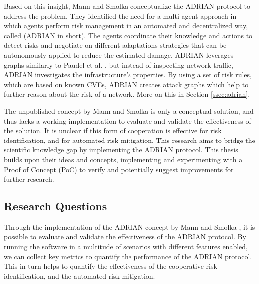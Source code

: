 Based on this insight, Mann and Smolka \cite{mann2023ADRIAN} conceptualize the ADRIAN protocol to address the problem. They identified the need for a multi-agent approach in which agents perform risk management in an automated and decentralized way, called \ADRIAN (ADRIAN in short). The agents coordinate their knowledge and actions to detect risks and negotiate on different adaptations strategies that can be autonomously applied to reduce the estimated damage. ADRIAN leverages graphs similarly to Paudel et al. \cite{paudel2019detecting}, but instead of inspecting network traffic, ADRIAN investigates the infrastructure's properties. By using a set of risk rules, which are based on known CVEs, ADRIAN creates attack graphs which help to further reason about the risk of a network. More on this in Section \ref{ssec:adrian}. 

The unpublished concept by Mann and Smolka \cite{mann2023ADRIAN} is only a conceptual solution, and thus lacks a working implementation to evaluate and validate the effectiveness of the solution. It is unclear if this form of cooperation is effective for risk identification, and for automated risk mitigation. This research aims to bridge the scientific knowledge gap by implementing the ADRIAN protocol. This thesis builds upon their ideas and concepts, implementing and experimenting with a Proof of Concept (PoC) to verify and potentially suggest improvements for further research. 


\subsection*{Research Questions}
\label{ssec:research-questions}
Through the implementation of the ADRIAN concept by Mann and Smolka \cite{mann2023ADRIAN}, it is possible to evaluate and validate the effectiveness of the ADRIAN protocol. By running the software in a multitude of scenarios with different features enabled, we can collect key metrics to quantify the performance of the ADRIAN protocol. This in turn helps to quantify the effectiveness of the cooperative risk identification, and the automated risk mitigation.

